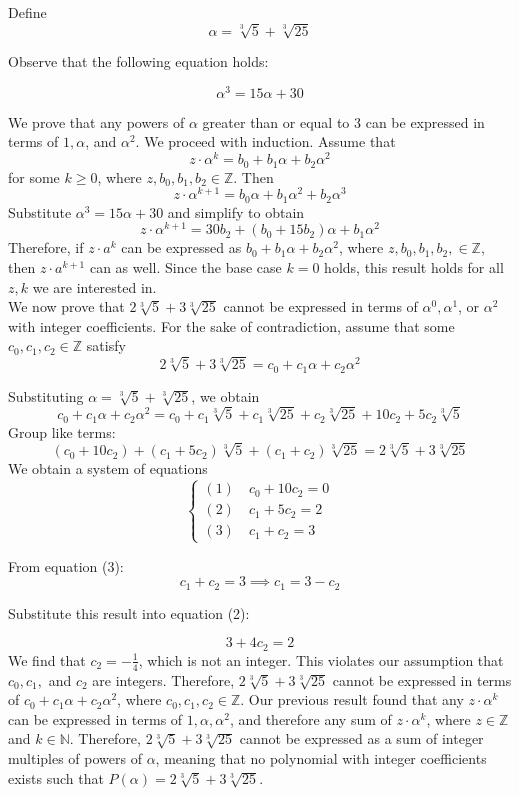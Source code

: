 \documentclass[11pt, letterpaper]{article}
\begin{document}
\begin{solution}{5}

Define $$\alpha = \sqrt[3]{5} + \sqrt[3]{25}$$

Observe that the following equation holds: 

$$\alpha^3 = 15\alpha +30$$ 

We prove that any powers of $\alpha$ greater than or equal to 3 can be expressed in terms of $1,\alpha$, and $\alpha^2$. We proceed with induction. Assume that  $$z\cdot\alpha^k = b_0 + b_1\alpha+b_2\alpha^2$$ for some $k \ge 0$, where $z,b_0, b_1,b_2 \in \mathbb{Z}$. Then $$z\cdot\alpha^{k+1} = b_0\alpha + b_1\alpha^2+b_2\alpha^3$$ Substitute $\alpha^3 = 15\alpha +30$ and simplify to obtain $$z\cdot\alpha^{k+1} = 30b_2 + (b_0+15b_2)\alpha + b_1\alpha^2$$ Therefore, if $z\cdot a^k$ can be expressed as $b_0 + b_1\alpha+b_2\alpha^2$, where  $z,b_0, b_1,b_2,\in \mathbb{Z}$, then $z\cdot a^{k+1}$ can as well. Since the base case $k=0$ holds, this result holds for all $z,k$ we are interested in.\\

We now prove that $2\sqrt[3]{5} + 3\sqrt[3]{25}$ cannot be expressed in terms of $\alpha^0,\alpha^1$, or $\alpha^2$ with integer coefficients. For the sake of contradiction, assume that some $c_0,c_1,c_2 \in \mathbb{Z}$ satisfy $$2\sqrt[3]{5} + 3\sqrt[3]{25} = c_0 + c_1\alpha+c_2\alpha^2$$

Substituting $\alpha = \sqrt[3]{5} + \sqrt[3]{25}$, we obtain $$c_0 + c_1\alpha+c_2\alpha^2 = c_0 + c_1\sqrt[3]{5} + c_1\sqrt[3]{25}+ c_2\sqrt[3]{25} + 10c_2 + 5c_2\sqrt[3]{5}$$ Group like terms: $$(c_0 +10c_2) + (c_1+5c_2)\sqrt[3]{5} + (c_1+c_2)\sqrt[3]{25} = 2\sqrt[3]{5} + 3\sqrt[3]{25}$$We obtain a system of equations $$\begin{cases} 
      (1) \quad c_0+10c_2 =0\\
      (2) \quad c_1+5c_2=2\\
      (3) \quad c_1+c_2=3
   \end{cases}$$

From equation (3): $$c_1+c_2 = 3 \implies c_1 = 3-c_2$$

Substitute this result into equation (2):

$$3 + 4c_2 = 2$$ We find that $c_2 = -\frac{1}{4}$, which is not an integer. This violates our assumption that $c_0 , c_1,$ and $c_2$ are integers. Therefore, $2\sqrt[3]{5} + 3\sqrt[3]{25}$ cannot be expressed in terms of $c_0 + c_1\alpha+c_2\alpha^2$, where $c_0,c_1,c_2 \in \mathbb{Z}$. Our previous result found that any $z\cdot\alpha^k$ can be expressed in terms of $1,\alpha,\alpha^2$, and therefore any sum of $z\cdot\alpha^k$, where $z\in\mathbb{Z}$ and $k \in \mathbb{N}$. Therefore,  $2\sqrt[3]{5} + 3\sqrt[3]{25}$ cannot be expressed as a sum of integer multiples of powers of $\alpha$, meaning that no polynomial with integer coefficients exists such that $P(\alpha) = 2\sqrt[3]{5} + 3\sqrt[3]{25}$.

\end{solution}
\end{document}
